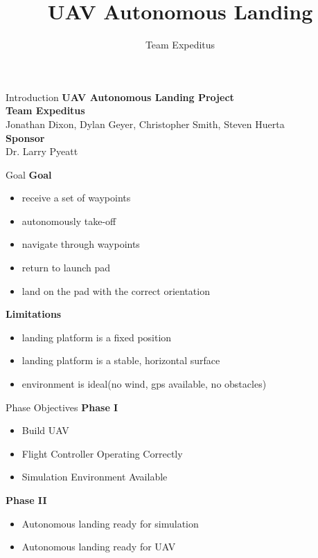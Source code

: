 \documentclass[11pt]{beamer}
\author{Team Expeditus}
\title{UAV Autonomous Landing}
\institute{SDSMT MCS}
\begin{document}
\begin{frame}
\titlepage
\end{frame}


\begin{frame}{Introduction}
\textbf{UAV Autonomous Landing Project}\\
\vspace{12mm}
\textbf{Team Expeditus}\\
Jonathan Dixon, Dylan Geyer, Christopher Smith, Steven Huerta\\ 
\vspace{6mm}
\textbf{Sponsor}\\
Dr. Larry Pyeatt\\
\end{frame}

\begin{frame}{Goal}
\textbf{Goal}\\
\begin{itemize}
\item receive a set of waypoints
\item autonomously take-off
\item navigate through waypoints
\item return to launch pad
\item land on the pad with the correct orientation
\end{itemize}
\vspace{6mm}
\textbf{Limitations}\\
\begin{itemize}
\item landing platform is a fixed position
\item landing platform is a stable, horizontal surface
\item environment is ideal(no wind, gps available, no obstacles)
\end{itemize}

\end{frame}

\begin{frame}{Phase Objectives}
\textbf{Phase I}
\begin{itemize}
\item Build UAV 
\item Flight Controller Operating Correctly
\item Simulation Environment Available
\end{itemize}
\vspace{5mm}
\textbf{Phase II}
\begin{itemize}
\item Autonomous landing ready for simulation
\item Autonomous landing ready for UAV
\end{itemize}
\end{frame}
\end{document}
